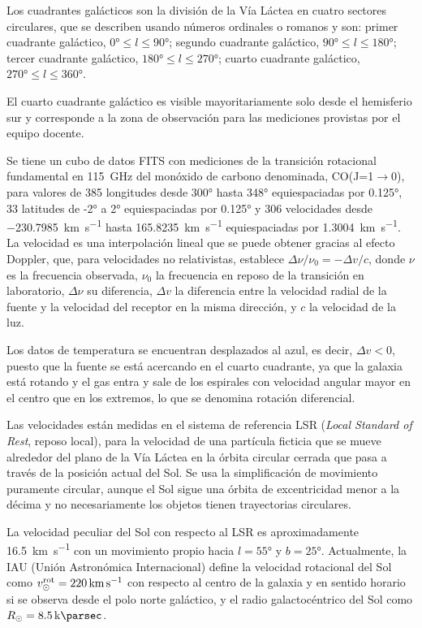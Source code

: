 Los cuadrantes galácticos son la división de la Vía Láctea en cuatro sectores circulares, que se describen usando números ordinales o romanos y son: primer cuadrante galáctico, $\ang{0}\le l\le\ang{90}$; segundo cuadrante galáctico, $\ang{90}\le l\le\ang{180}$; tercer cuadrante galáctico, $\ang{180}\le l\le\ang{270}$; cuarto cuadrante galáctico, $\ang{270}\le l\le\ang{360}$.

El cuarto cuadrante galáctico es visible mayoritariamente solo desde el hemisferio sur y corresponde a la zona de observación para las mediciones provistas por el equipo docente.

Se tiene un cubo de datos FITS con mediciones de la transición rotacional fundamental en \SI{115}{\giga\hertz} del monóxido de carbono denominada, CO(J=1$\to$0), para valores de 385 longitudes desde \ang{300} hasta \ang{348} equiespaciadas por \ang{0.125}, 33 latitudes de \ang{-2} a \ang{2} equiespaciadas por \ang{0.125} y 306 velocidades desde \SI{-230.7985}{\kilo\metre\per\second} hasta \SI{165.8235}{\kilo\metre\per\second} equiespaciadas por \SI{1.3004}{\kilo\metre\per\second}. La velocidad es una interpolación lineal que se puede obtener gracias al efecto Doppler, que, para velocidades no relativistas, establece ${\Delta\nu}/{\nu_0}=-{\Delta v}/{c}$, donde $\nu$ es la frecuencia observada, $\nu_0$ la frecuencia en reposo de la transición en laboratorio, $\Delta \nu$ su diferencia, $\Delta v$ la diferencia entre la velocidad radial de la fuente y la velocidad del receptor en la misma dirección, y $c$ la velocidad de la luz.

Los datos de temperatura se encuentran desplazados al azul, es decir, $\Delta v<0$, puesto que la fuente se está acercando en el cuarto cuadrante, ya que la galaxia está rotando y el gas entra y sale de los espirales con velocidad angular mayor en el centro que en los extremos, lo que se denomina rotación diferencial.

Las velocidades están medidas en el sistema de referencia LSR (\textit{Local Standard of Rest}, reposo local), para la velocidad de una partícula ficticia que se mueve alrededor del plano de la Vía Láctea en la órbita circular cerrada que pasa a través de la posición actual del Sol. Se usa la simplificación de movimiento puramente circular, aunque el Sol sigue una órbita de excentricidad menor a la décima y no necesariamente los objetos tienen trayectorias circulares.

La velocidad peculiar del Sol con respecto al LSR es aproximadamente \SI{16.5}{\kilo\metre\per\second} con un movimiento propio hacia $l=\ang{55}$ y $b=\ang{25}$. Actualmente, la IAU (Unión Astronómica Internacional) define la velocidad rotacional del Sol como $v_\odot^{\textnormal{rot}}=\SI{220}{\kilo\metre\per\second}$ con respecto al centro de la galaxia y en sentido horario si se observa desde el polo norte galáctico, y el radio galactocéntrico del Sol como $R_\odot=\SI{8.5}{\kilo\parsec}$.

